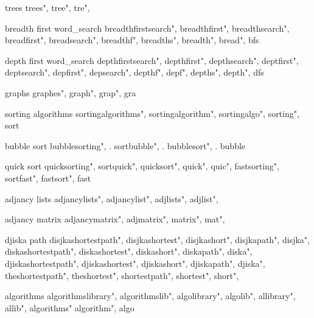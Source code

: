          trees 
        trees",
        tree",
        tre",
        
         breadth first word_search 
        breadthfirstsearch",  
        breadthfirst",  
        breadthsearch",  
        breadfirst",  
        breadsearch",  
        breadthf",  
        breadths",  
        breadth",  
        bread",  
        bfs
        
         depth first word_search 
        depthfirstsearch",  
        depthfirst",  
        depthsearch",  
        deptfirst",  
        deptsearch",  
        depfirst",  
        depsearch",  
        depthf",  
        depf",  
        depths",  
        depth",  
        dfs
        
         graphs 
        graphes", 
        graph", 
        grap", 
        gra
        
         sorting algorithms 
        sortingalgorithms",  
        sortingalgorithm",  
        sortingalgo",  
        sorting",  
        sort
        
         bubble sort 
        bubblesorting", . 
        sortbubble", . 
        bubblesort", . 
        bubble
        
         quick sort 
        quicksorting",  
        sortquick",  
        quicksort",  
        quick",  
        quic",  
        fastsorting",  
        sortfast",  
        fastsort",  
        fast
        
         adjancy lists
        adjancylists",  
        adjancylist",  
        adjlists",  
        adjlist",  
        
         adjancy matrix 
        adjancymatrix",  
        adjmatrix",  
        matrix",  
        mat",  
        
         djiska path 
        disjkashortestpath",  
        disjkashortest",  
        disjkashort",  
        disjkapath",  
        disjka",  
        diskashortestpath",  
        diskashortest",  
        diskashort",  
        diskapath",  
        diska",  
        djiskashortestpath",  
        djiskashortest",  
        djiskashort",  
        djiskapath",  
        djiska",  
        theshortestpath",  
        theshortest",  
        shortestpath",  
        shortest",  
        short",  
        
         algorithms 
        algorithmslibrary", 
        algorithmslib",
        algolibrary",
        algolib",
        allibrary",
        allib",
        algorithms"
        algorithm",
        algo
        
